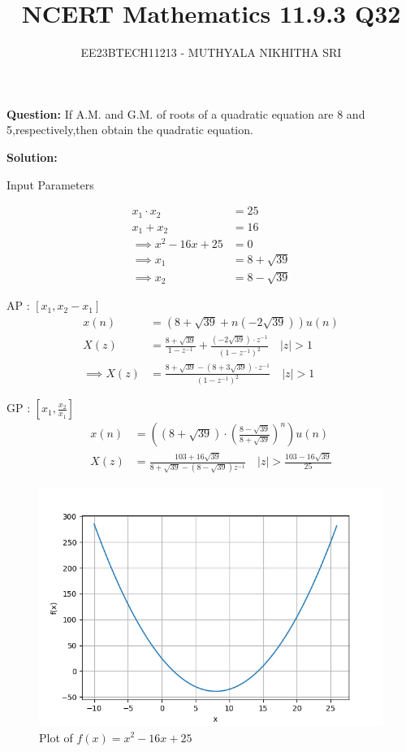 \documentclass[journal,12pt,twocolumn]{IEEEtran}
\title{
	
\title{NCERT Mathematics 11.9.3 Q32}
\author{EE23BTECH11213 - MUTHYALA NIKHITHA SRI
}


}
\providecommand{\brak}[1]{\ensuremath{\left(#1\right)}}
\theoremstyle{remark}
\begin{document}
\maketitle

\textbf{Question:} 
If A.M. and G.M. of roots of a quadratic equation are 8 and 5,respectively,then obtain the quadratic equation.

\textbf{Solution: }

\begin{table}[h]
 	\centering
 	\resizebox{6 cm}{!}{
 		
 	}
 	\caption{Input Parameters}
    \label{tab:table_9.3.32}
 \end{table}


\begin{align}
x_1 \cdot x_2 &= 25 \\
x_1 + x_2 &= 16 \\
\implies  x^2 - 16x + 25 &= 0 \\
\implies x_1 &= 8+\sqrt{39} \\
\implies x_2 &= 8-\sqrt{39} 
\end{align}

AP : $[x_1 , x_2-x_1]$ 
\begin{align}
x\brak{n} &= \brak{8+\sqrt{39} + n\brak{-2\sqrt{39}}}u\brak{n} \\
X\brak{z} &= \frac{8+\sqrt{39}}{1 - z^{-1}} + \frac{\brak{-2\sqrt{39}}\cdot z^{-1}}{\brak{1 - z^{-1}}^2}  \quad |z| > 1 \\
\implies X\brak{z} &= \frac{8+\sqrt{39}-\brak{8+3\sqrt{39}}\cdot{z^{-1}}}{\brak{1 - z^{-1}}^2} \quad |z| > 1
\end{align}

GP : $[x_1 , \frac{x_2}{x_1}]$
\begin{align}
x\brak{n} &= \brak{\brak{8+\sqrt{39}}\cdot {\brak{\frac{8-\sqrt{39}}{8+\sqrt{39}}}}^{n}}u\brak{n} \\
X\brak{z} &= \frac{103+16\sqrt{39}}{8+\sqrt{39}-\brak{8-\sqrt{39}}z^{-1}} \quad |z| > \frac{103-16\sqrt{39}}{25}
\end{align}

\begin{figure}[h!]
    \centering
    \includegraphics[width=\columnwidth]{figs/f1.png}
    \caption{Plot of $f\brak{x} = x^{2}-16x+25$}
    \label{fig:1}
\end{figure}
\end{document}
